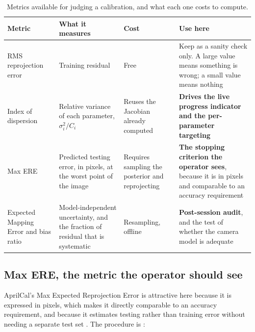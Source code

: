 \begin{table}[!ht]
\centering
\small
\caption[Calibration quality metrics]{Metrics available for judging a calibration, and what each one costs to compute.}
\label{tab:metrics}
\begin{tabularx}{\textwidth}{p{} p{} p{} X}
\toprule
\textbf{Metric} & \textbf{What it measures} & \textbf{Cost} & \textbf{Use here} \\
\midrule
RMS reprojection error & Training residual & Free & Keep as a sanity check only. A large value means something is wrong; a small value means nothing \\
Index of dispersion \cite{rojtberg2018pose} & Relative variance of each parameter, $\sigma_i^2/C_i$ & Reuses the Jacobian already computed & \textbf{Drives the live progress indicator and the per-parameter targeting} \\
Max ERE \cite{richardson2013aprilcal} & Predicted testing error, in pixels, at the worst point of the image & Requires sampling the posterior and reprojecting & \textbf{The stopping criterion the operator sees}, because it is in pixels and comparable to an accuracy requirement \\
Expected Mapping Error and bias ratio \cite{hagemann2021bias} & Model-independent uncertainty, and the fraction of residual that is systematic & Resampling, offline & \textbf{Post-session audit}, and the test of whether the camera model is adequate \\
\bottomrule
\end{tabularx}
\end{table}

\subsection{Max ERE, the metric the operator should see}

AprilCal's Max Expected Reprojection Error is attractive here because it is expressed in pixels, which makes it directly comparable to an accuracy requirement, and because it estimates testing rather than training error without needing a separate test set \cite{richardson2013aprilcal}. The procedure is \cite{richardson2013aprilcal}:

